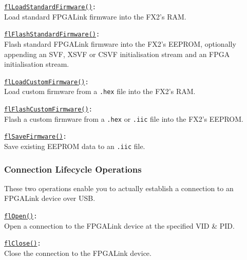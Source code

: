 \begin{desc}
  \item[\texttt{\href{http://www.swaton.ukfsn.org/apidocs/libfpgalink\_8h.html\#a45c33041d9f6331e378ca6092646b399}{flLoadStandardFirmware()}:}] \hfill \\
    Load standard FPGALink firmware into the FX2's RAM. 
  \item[\texttt{\href{http://www.swaton.ukfsn.org/apidocs/libfpgalink\_8h.html\#a2b134bdad721202aade02cf3e6ac675b}{flFlashStandardFirmware()}:}] \hfill \\
    Flash standard FPGALink firmware into the FX2's EEPROM, optionally appending an SVF, XSVF or CSVF initialisation stream and an FPGA initialisation stream. 
  \item[\texttt{\href{http://www.swaton.ukfsn.org/apidocs/libfpgalink\_8h.html\#ae14ca5ab58b526815c80ca09793e5e34}{flLoadCustomFirmware()}:}] \hfill \\
    Load custom firmware from a \texttt{.hex} file into the FX2's RAM.
  \item[\texttt{\href{http://www.swaton.ukfsn.org/apidocs/libfpgalink\_8h.html\#a3f39c11daf31e2c1d82b35e88ad9c804}{flFlashCustomFirmware()}:}] \hfill \\
    Flash a custom firmware from a \texttt{.hex} or \texttt{.iic} file into the FX2's EEPROM.
  \item[\texttt{\href{http://www.swaton.ukfsn.org/apidocs/libfpgalink\_8h.html\#addfaedd80f0f40c9a1f134766235b23b}{flSaveFirmware()}:}] \hfill \\
    Save existing EEPROM data to an \texttt{.iic} file.
\end{desc}

\subsubsection{Connection Lifecycle Operations}
These two operations enable you to actually establish a connection to an FPGALink device over USB.

\begin{desc}
  \item[\texttt{\href{http://www.swaton.ukfsn.org/apidocs/libfpgalink\_8h.html\#a241ac59f7ba96caba2e1262ffd0d4424}{flOpen()}:}] \hfill \\
    Open a connection to the FPGALink device at the specified VID \& PID.
  \item[\texttt{\href{http://www.swaton.ukfsn.org/apidocs/libfpgalink\_8h.html\#aec8a71aea72766e3c57fa857c5f5f742}{flClose()}:}] \hfill \\
    Close the connection to the FPGALink device.
\end{desc}

